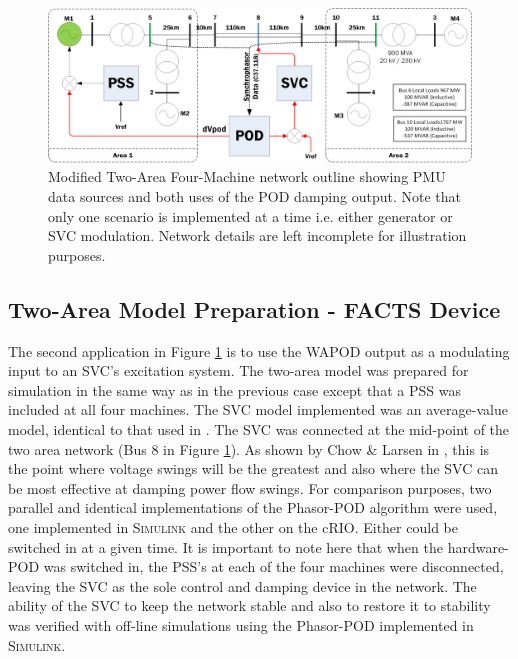 \documentclass[journal]{IEEEtran}
\begin{document}
\begin{figure}[!thpb]
\centering
\includegraphics[width=5in]{Kundur2Area_outline_multi.png}
\caption{Modified Two-Area Four-Machine network outline showing PMU data sources and both uses of the POD damping output. Note that only one scenario is implemented at a time i.e. either generator or SVC modulation. Network details are left incomplete for illustration purposes.}
\label{NetworkOutline}
\end{figure}





\subsection{Two-Area Model Preparation - FACTS Device}

The second application in Figure \ref{NetworkOutline} is to use the WAPOD output as a modulating input to an SVC's excitation system. The two-area model was prepared for simulation in the same way as in the previous case except that a PSS was included at all four machines. The SVC model implemented was an average-value model, identical to that used in \cite{PhasorPODImplement}. The SVC was connected at the mid-point of the two area network (Bus 8 in Figure \ref{NetworkOutline}). As shown by Chow \& Larsen in \cite{sVARdamp}, this is the point where voltage swings will be the greatest and also where the SVC can be most effective at damping power flow swings. For comparison purposes, two parallel and identical implementations of the Phasor-POD algorithm were used, one implemented in \textsc{Simulink} and the other on the cRIO. Either could be switched in at a given time. It is important to note here that when the hardware-POD was switched in, the PSS's at each of the four machines were disconnected, leaving the SVC as the sole control and damping device in the network. The ability of the SVC to keep the network stable and also to restore it to stability was verified with off-line simulations using the Phasor-POD implemented in \textsc{Simulink}.%
\end{document}
